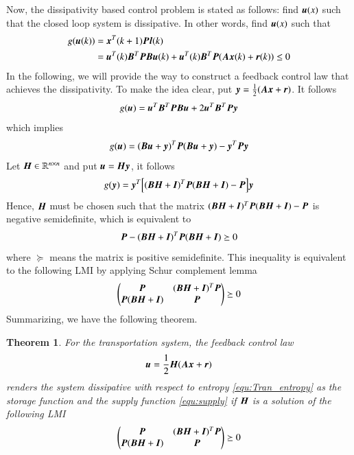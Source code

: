 \documentclass[preprint,authoryear,12pt]{elsarticle}
\renewcommand{\vec}[1]{\mbox{\boldmath$#1$}}
\newcommand{\mat}[1]{\mbox{\boldmath$#1$}}
\newtheorem{thm}{Theorem}
\begin{document}
Now, the dissipativity based control problem is stated as follows:
find $\vec{u}(x)$ such that the closed loop system is dissipative. In
other words, find $\vec{u}(x)$ such that
\begin{align*}
g(\vec{u}(k))&=\vec{x}^T(k+1)\mat{P}\vec{l}(k)\\
&=\vec{u}^T(k)\mat{B}^T\mat{P}\mat{B}\vec{u}(k)
+\vec{u}^T(k)\mat{B}^T\mat{P}(\mat{A}\vec{x}(k)+\vec{r}(k))\leq 0
\end{align*}
In the following, we will provide the way to construct a feedback
control law that achieves the dissipativity. To make the idea clear,
put $\vec{y}=\frac{1}{2}(\mat{A}\vec{x}+\vec{r})$. It follows 
\begin{equation}\label{pbc}
g(\vec{u})=\vec{u}^T\mat{B}^T\mat{P}\mat{B}\vec{u}+2\vec{u}^T\mat{B}^T\mat{P}\vec{y}
\end{equation}
which implies
$$g(\vec{u})=(\mat{B}\vec{u}
+\vec{y})^T \mat{P} (\mat{B}\vec{u}
+\vec{y})-\vec{y}^T
\mat{P}\vec{y}$$
Let $\mat{H}\in\mathbb{R}^{n\times n}$ and put
$\vec{u}=\mat{H}\vec{y}$, it follows
$$g(\vec{y})= \vec{y}^T\Bigl[(\mat{B}\mat{H}+\mat{I})^T \mat{P}
(\mat{B}\mat{H}+\mat{I})-\mat{P}\Bigr]\vec{y}
$$
Hence, $\mat{H}$ must be chosen such that the matrix
$(\mat{B}\mat{H}+\mat{I})^T \mat{P}
(\mat{B}\mat{H}+\mat{I})-\mat{P}$ is negative
semidefinite, which is equivalent to
$$\mat{P}-(\mat{B}\mat{H}+\mat{I})^T \mat{P}
(\mat{B}\mat{H}+\mat{I})\succeq 0$$
where $\succeq$ means the matrix is positive semidefinite.
This inequality is equivalent to the following LMI by applying Schur
complement lemma \citep{boyd_linear_1994}
$$\begin{pmatrix}
\mat{P}& (\mat{B}\mat{H}+\mat{I})^T \mat{P} \\
\mat{P} (\mat{B}\mat{H}+\mat{I})  & \mat{P}
\end{pmatrix}\succeq 0$$
Summarizing, we have the following theorem. 

\begin{thm}\label{thm:pbc}
For the transportation system, the feedback control law
\begin{equation}
\label{equ:feedback}
\vec{u}=\frac{1}{2}\mat{H}(\mat{A}\vec{x}+\vec{r})
\end{equation}
renders the system dissipative with respect to
entropy \eqref{equ:Tran_entropy} as the storage function and the
supply function \eqref{equ:supply} if $\mat{H}$ is a solution of the
following LMI
\begin{equation}\label{equ:lmi}
\begin{pmatrix}
\mat{P}& (\mat{B}\mat{H}+\mat{I})^T \mat{P} \\
\mat{P} (\mat{B}\mat{H}+\mat{I})  & \mat{P}
\end{pmatrix}\succeq 0
\end{equation}
\end{thm}
\end{document}
